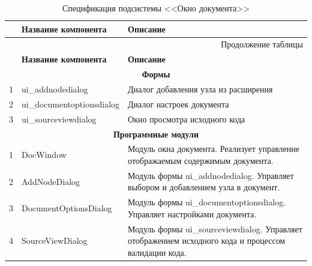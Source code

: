 \small
\singlespacing
\begin{longtable}[h]{|p{}|p{}|p{}|}
  \caption{Спецификация подсистемы <<Окно документа>>}
	\\ \hline
	  \textbf{\No}                  &
	  \textbf{Название компонента}  &
	  \textbf{Описание}
	\\ \hline
  \endfirsthead

  \multicolumn{3}{r}{Продолжение таблицы \thetable{}}
  \\ \hline
	  \textbf{\No}                  &
	  \textbf{Название компонента}  &
	  \textbf{Описание}
	\\ \hline
  \endhead

  \multicolumn{3}{|c|}{\textbf{Формы}} \\
  \hline
  1 & ui\_addnodedialog & Диалог добавления узла из расширения \\ \hline
  2 & ui\_documentoptionsdialog & Диалог настроек документа \\ \hline
  3 & ui\_sourceviewdialog & Окно просмотра исходного кода \\ \hline

  \multicolumn{3}{|c|}{\textbf{Программные модули}} \\
  \hline
  1 & DocWindow & Модуль окна документа. Реализует управление отображаемым содержимым документа. \\ \hline
  2 & AddNodeDialog & Модуль формы ui\_addnodedialog. Управляет выбором и добавлением узла в документ. \\ \hline
  3 & DocumentOptionsDialog & Модуль формы ui\_documentoptionsdialog. Управляет настройками документа. \\ \hline
  4 & SourceViewDialog & Модуль формы ui\_sourceviewdialog. Управляет отображением исходного кода и процессом валидации кода. \\ \hline
\end{longtable}
\normalsize
\onehalfspacing

